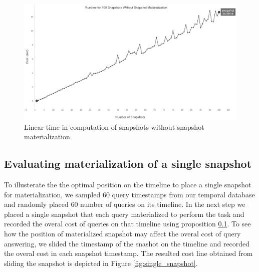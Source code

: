 \begin{figure}
	\label{fig:linear_time}
	\centering
	\includegraphics[width=\textwidth]{figs/runtime.jpg}
	\caption{Linear time in computation of snapshots without snapshot materialization}
\end{figure} 

\subsection{Evaluating materialization of a single snapshot}
To illusterate the the optimal position on the timeline to place a single snapshot for materialization, we sampled 60 query timestamps from our temporal database and randomly placed 60 number of queries on its timeline. In the next step we placed a single snapshot that each query materialized to perform the task and recorded the overal cost of queries on that timeline using proposition \ref{}. To see how the position of materialized snapshot may affect the overal cost of query answering, we slided the timestamp of the snashot on the timeline and recorded the overal cost in each snapshot timestamp. The resulted cost line obtained from sliding the snapshot is depicted in Figure \ref{fig:single_snapshot}. 

